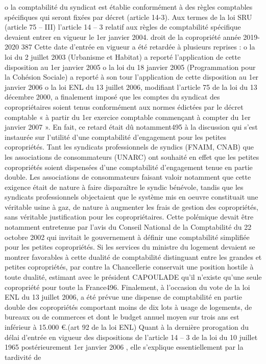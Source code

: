 o la comptabilité du syndicat est établie conformément à des règles comptables spécifiques qui seront fixées par décret (article 14-3).
Aux termes de la loi SRU (article 75 – III) l'article 14 – 3 relatif aux règles de comptabilité spécifique devaient entrer en vigueur le 1er janvier 2004.
droit de la copropriété année 2019-2020
387
Cette date d'entrée en vigueur a été retardée à plusieurs reprises :
o la loi du 2 juillet 2003 (Urbanisme et Habitat) a reporté l'application de cette disposition au 1er janvier 2005
o la loi du 18 janvier 2005 (Programmation pour la Cohésion Sociale) a reporté à son tour l'application de cette disposition au 1er janvier 2006
o la loi ENL du 13 juillet 2006, modifiant l’article 75 de la loi du 13 décembre 2000, a finalement imposé que les comptes du syndicat des copropriétaires soient tenus conformément aux normes édictées par le décret comptable « à partir du 1er exercice comptable commençant à compter du 1er janvier 2007 ».
En fait, ce retard était dû notamment495 à la discussion qui s'est instaurée sur l'utilité d'une comptabilité d'engagement pour les petites copropriétés.
Tant les syndicats professionnels de syndics (FNAIM, CNAB) que les associations de consommateurs (UNARC) ont souhaité en effet que les petites copropriétés soient dispensées d'une comptabilité d'engagement tenue en partie double. Les associations de consommateurs faisant valoir notamment que cette exigence était de nature à faire disparaître le syndic bénévole, tandis que les syndicats professionnels objectaient que le système mis en oeuvre constituait une véritable usine à gaz, de nature à augmenter les frais de gestion des copropriétés, sans véritable justification pour les copropriétaires.
Cette polémique devait être notamment entretenue par l'avis du Conseil National de la Comptabilité du 22 octobre 2002 qui invitait le gouvernement à définir une comptabilité simplifiée pour les petites copropriétés.
Si les services du ministre du logement devaient se montrer favorables à cette dualité de comptabilité distinguant entre les grandes et petites copropriétés, par contre la Chancellerie conservait une position hostile à toute dualité, estimant avec le président CAPOULADE qu’il n'existe qu'une seule copropriété pour toute la France496.
Finalement, à l’occasion du vote de la loi ENL du 13 juillet 2006, a été prévue une dispense de comptabilité en partie double des copropriétés comportant moins de dix lots à usage de logements, de bureaux ou de commerces et dont le budget annuel moyen sur trois ans est inférieur à 15.000 €.(art 92 de la loi ENL)
Quant à la dernière prorogation du délai d'entrée en vigueur des dispositions de l’article 14 – 3 de la loi du 10 juillet 1965 postérieurement 1er janvier 2006 , elle s'explique essentiellement par la tardivité de
